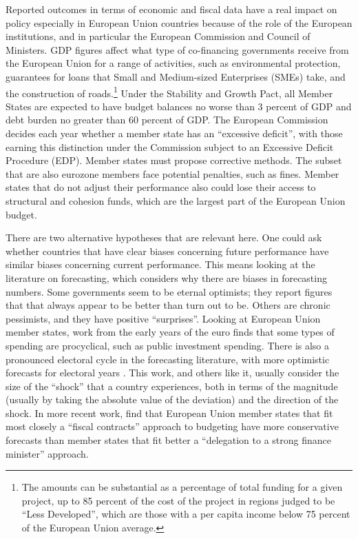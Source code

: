 \documentclass[]{article}
\begin{document}
Reported outcomes in terms of economic and fiscal data have a real impact on policy especially in European Union countries because of the role of the European institutions, and in particular the European Commission and Council of Ministers. GDP figures affect what type of co-financing governments receive from the European Union for a range of activities, such as environmental protection, guarantees for loans that Small and Medium-sized Enterprises (SMEs) take, and the construction of roads.\footnote{The amounts can be substantial as a percentage of total funding for a given project, up to 85 percent of the cost of the project in regions judged to be “Less Developed”, which are those with a per capita income below 75 percent of the European Union average.} Under the Stability and Growth Pact, all Member States are expected to have budget balances no worse than 3 percent of GDP and debt burden no greater than 60 percent of GDP. The European Commission decides each year whether a member state has an ``excessive deficit'', with those earning this distinction under the Commission subject to an Excessive Deficit Procedure (EDP). Member states must propose corrective methods. The subset that are also eurozone members face potential penalties, such as fines. Member states that do not adjust their performance also could lose their access to structural and cohesion funds, which are the largest part of the European Union budget.

There are two alternative hypotheses that are relevant here. One could ask whether countries that have clear biases concerning future performance have similar biases concerning current performance. This means looking at the literature on forecasting, which  considers why there are biases in forecasting numbers. Some governments seem to be eternal optimists; they report figures that that always appear to be better than turn out to be. Others are chronic pessimists, and they have positive ``surprises''. Looking at European Union member states, work from the early years of the euro finds that some types of spending are procyclical, such as public investment spending. There is also a pronounced electoral cycle in the forecasting literature, with more optimistic forecasts for electoral years \citep{hallerbergstrauch2002}. This work, and others like it, usually consider the size of the ``shock'' that a country experiences, both in terms of the magnitude (usually by taking the absolute value of the deviation) and the direction of the shock. In more recent work, \cite{hallerbergstrauch209} find that European Union member states that fit most closely a ``fiscal contracts'' approach to budgeting have more conservative forecasts than member states that fit better a ``delegation to a strong finance minister'' approach.
\end{document}
